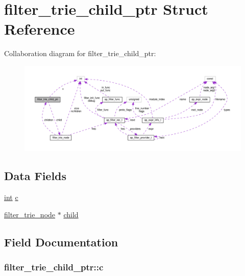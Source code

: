 \hypertarget{structfilter__trie__child__ptr}{}\section{filter\+\_\+trie\+\_\+child\+\_\+ptr Struct Reference}
\label{structfilter__trie__child__ptr}


Collaboration diagram for filter\+\_\+trie\+\_\+child\+\_\+ptr\+:
\nopagebreak
\begin{figure}[H]
\begin{center}
\leavevmode
\includegraphics[width=350pt]{structfilter__trie__child__ptr__coll__graph}
\end{center}
\end{figure}
\subsection*{Data Fields}
\begin{DoxyCompactItemize}
\item 
\hyperlink{pcre_8txt_a42dfa4ff673c82d8efe7144098fbc198}{int} \hyperlink{structfilter__trie__child__ptr_af278860c482c095db1445a5d1f348ebf}{c}
\item 
\hyperlink{structfilter__trie__node}{filter\+\_\+trie\+\_\+node} $\ast$ \hyperlink{structfilter__trie__child__ptr_a5804a089566068fc0b1488d474bac67c}{child}
\end{DoxyCompactItemize}


\subsection{Field Documentation}
\subsubsection[{\texorpdfstring{c}{c}}]{ filter\+\_\+trie\+\_\+child\+\_\+ptr\+::c}\hypertarget{structfilter__trie__child__ptr_af278860c482c095db1445a5d1f348ebf}{}\label{structfilter__trie__child__ptr_af278860c482c095db1445a5d1f348ebf}

